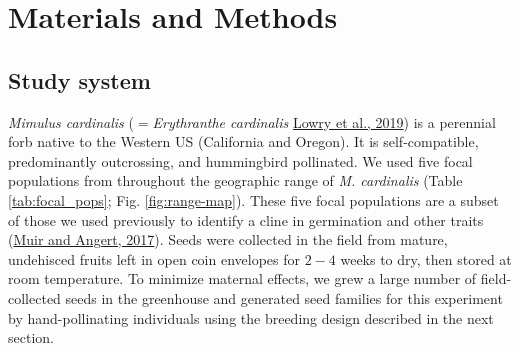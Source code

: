 \documentclass[
  12pt,
]{article}
\begin{document}
\hypertarget{materials-and-methods}{%
\section{Materials and Methods}\label{materials-and-methods}}

\hypertarget{study-system}{%
\subsection{Study system}\label{study-system}}

\emph{Mimulus cardinalis} (\(=\)\emph{Erythranthe cardinalis} \protect\hyperlink{ref-lowry_case_2019}{Lowry et al., 2019}) is a perennial forb native to the Western US (California and Oregon). It is self-compatible, predominantly outcrossing, and hummingbird pollinated. We used five focal populations from throughout the geographic range of \emph{M. cardinalis} (Table \ref{tab:focal_pops}; Fig. \ref{fig:range-map}). These five focal populations are a subset of those we used previously to identify a cline in germination and other traits (\protect\hyperlink{ref-muir_grow_2017}{Muir and Angert, 2017}). Seeds were collected in the field from mature, undehisced fruits left in open coin envelopes for \(2-4\) weeks to dry, then stored at room temperature. To minimize maternal effects, we grew a large number of field-collected seeds in the greenhouse and generated seed families for this experiment by hand-pollinating individuals using the breeding design described in the next section.
\end{document}
